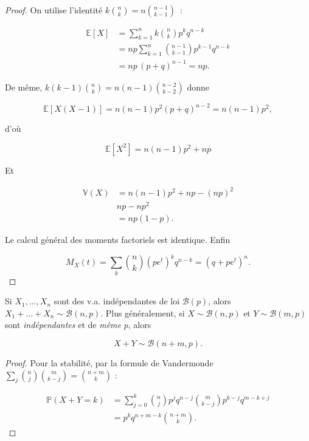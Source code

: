 \begin{proof}
On utilise l'identité $k\binom nk=n\binom{n-1}{k-1}$~:

\begin{align*}
\mathbb{E}[X] &=\sum_{k=1}^n k\binom nk p^kq^{n-k} \\
&=np\sum_{k=1}^n\binom{n-1}{k-1}p^{k-1}q^{n-k} \\
&=np\,(p+q)^{n-1}=np.
\end{align*}

De même, $k(k-1)\binom nk=n(n-1)\binom{n-2}{k-2}$ donne

$$
\mathbb{E}[X(X-1)]=n(n-1)p^2(p+q)^{n-2}=n(n-1)p^2,
$$ 

d'où

$$
\mathbb{E}[X^2]=n(n-1)p^2+np
$$

Et 

\begin{align*}
\mathbb{V}(X) &= n(n-1)p^2+np-(np)^2 \\
&np-np^2 \\
&= np(1-p).
\end{align*}

Le calcul général des moments factoriels est identique. Enfin

$$
M_X(t)=\sum_k\binom nk (pe^t)^k q^{n-k}=(q+pe^t)^n.
$$
\end{proof}

\begin{mdframed}
\begin{proposition}
Si $X_1,\dots,X_n$ sont des v.a. indépendantes de loi $\mathcal{B}(p)$, alors $X_1+\dots+X_n\sim \mathcal{B}(n,p)$. Plus généralement, si $X\sim \mathcal{B}(n,p)$ et $Y\sim \mathcal{B}(m,p)$ sont \textit{indépendantes} et de \textit{même} $p$, alors

$$
  X+Y\sim \mathcal{B}(n+m,p).
$$
\end{proposition}
\end{mdframed}

\begin{proof}
Pour la stabilité, par la formule de Vandermonde $\sum_{j}\binom nj\binom{m}{k-j}=\binom{n+m}{k}$ :

\begin{align*}
\mathbb{P}(X+Y=k) &= \sum_{j=0}^k\binom nj p^jq^{n-j}\binom{m}{k-j}p^{k-j}q^{m-k+j} \\
&=p^kq^{n+m-k}\binom{n+m}{k}. 
\end{align*}
\end{proof}

